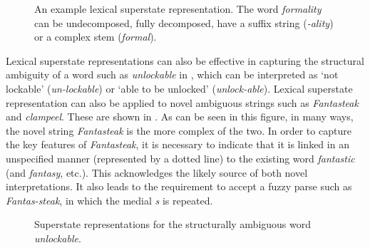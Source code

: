 \documentclass[output=paper]{langsci/langscibook}
\begin{document}
\begin{figure}
\caption{\label{fig:libben:1}An example lexical superstate representation. The word \textit{formality} can be undecomposed, fully decomposed, have a suffix string (\textit{-ality}) or a complex stem (\textit{formal}).}
\end{figure}

Lexical superstate representations can also be effective in capturing the structural ambiguity of a word such as \textit{unlockable} in , which can be interpreted as `not lockable' (\textit{un-lockable}) or `able to be unlocked' (\textit{unlock-able}). Lexical superstate representation can also be applied to novel ambiguous strings such as \textit{Fantasteak} and \textit{clampeel}. These are shown in . As can be seen in this figure, in many ways, the novel string \textit{Fantasteak} is the more complex of the two. In order to capture the key features of \textit{Fantasteak}, it is necessary to indicate that it is linked in an unspecified manner (represented by a dotted line) to the existing word \textit{fantastic} (and \textit{fantasy}, etc.). This acknowledges the likely source of both novel interpretations. It also leads to the requirement to accept a fuzzy parse such as \textit{Fantas-steak}, in which the medial \textit{s} is repeated.\largerpage[-1]


\begin{figure}
\caption{\label{fig:libben:2}Superstate representations for the structurally ambiguous word \textit{unlockable}.}
\end{figure}
\end{document}

